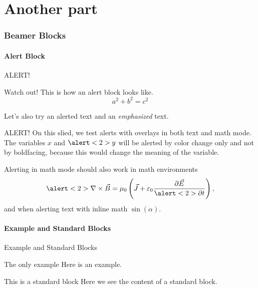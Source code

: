 \part{Another part}
\section{Beamer Blocks}
\subsection{Alert Block}
\begin{frame}{ALERT!}
  \begin{alertblock}{Watch out!}
    This is how an alert block looks like.
    \begin{equation}
      a^2 + b^2 = c^2
    \end{equation}
  \end{alertblock}
  Let's also try an \alert{alerted} text and an \emph{emphasized} text.
\end{frame}

\begin{frame}{ALERT!}
  On this slied, we test \alert<2>{alerts with overlays} in both text and
  math mode. The variables \alert<2>{$x$} and $\alert<2>{y}$ will be alerted
  by color change only and not by boldfacing, because this would change the
  meaning of the variable.

  Alerting in math mode should also work in math environments
  \begin{equation}
    \alert<2>{\nabla}\times\vec{B} = \mu_{0} \left(
      \vec{J} + \varepsilon_{0}\frac{\partial \vec{E}}{\alert<2>{\partial t}}
    \right),
  \end{equation}
  and when alerting text with \alert<2>{inline math $\sin(\alpha)$}.
\end{frame}

\subsection{Example and Standard Blocks}
\begin{frame}{Example and Standard Blocks}
  \begin{exampleblock}{The only example}
    Here is an example.
  \end{exampleblock}
  \begin{block}{This is a standard block}
    Here we see the content of a standard block.
  \end{block}
\end{frame}

